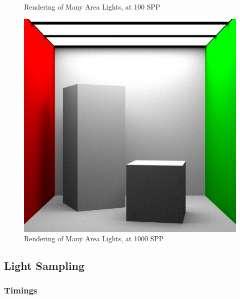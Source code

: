 \documentclass[a4paper]{myarticle}
\begin{document}
\begin{figure}[H]
\begin{minipage}[t]{.3\textwidth}
      \caption{Rendering of Many Area Lights, at 100 SPP}
  \end{minipage}
  \hfill
  \begin{minipage}[t]{.3\textwidth}
      \centering
      \includegraphics[width=\textwidth]{q3/many_1_1000.png}
      \caption{Rendering of Many Area Lights, at 1000 SPP}
  \end{minipage}
\end{figure}

\subsection{Light Sampling}

\subsubsection{Timings}
\end{document}
